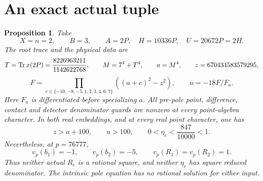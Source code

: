 \documentclass[11pt,a4paper]{article}
\newtheorem{proposition}{Proposition}
\begin{document}
\section*{An exact actual tuple}
\begin{proposition}
Take
\[
 X=n=2,\qquad B=3,\qquad A=2P,\quad H=10336P,\quad U=20672P=2H.
\]
The root trace and the physical data are
\[
 T=\operatorname{Tr} x(2P)=\frac{8226963211}{1142622768},\qquad
 M=7^4+T^4,\qquad a=M^4,\qquad z=670434583579295,
\]
\[
 F=\prod_{c\in\{-10,-8,-5,1,2,3,4,6,7\}}((a+c)^2-z^2),
 \qquad u=-18F/F_a.
\]
Here $F_a$ is differentiated before specializing $a$.
All pre-pole point, difference, contact and detector denominator guards
are nonzero at every point-algebra character. In both real embeddings,
and at every real point character, one has
\[
 z>a+100,\qquad u>100,\qquad 0<\eta_e<\frac{847}{10000}<1.
\]
Nevertheless, at $p=76777$,
\[
                 v_p(b_1)=-1,\qquad v_p(b_2)=-5,
                 \qquad v_p(R_1)=v_p(R_2)=1.
\]
Thus neither actual $R_e$ is a rational square, and neither $\eta_e$
has square reduced denominator. The intrinsic pole equation has no
rational solution for either input.
\end{proposition}
\end{document}
